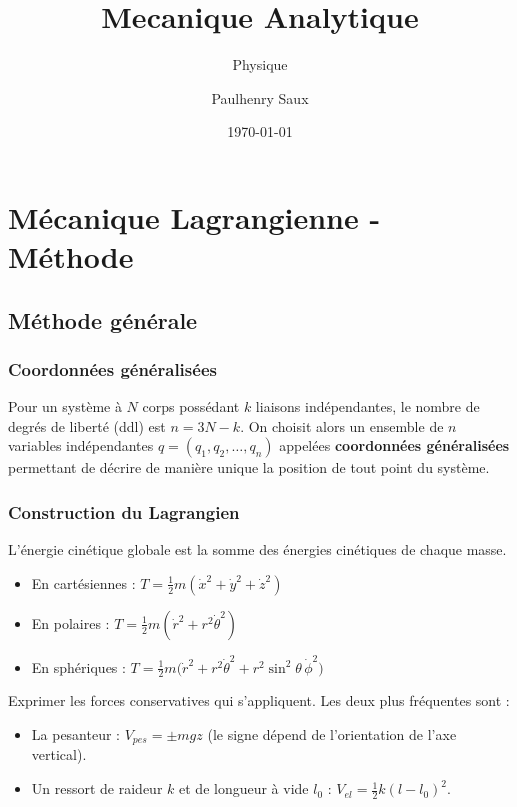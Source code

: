 \documentclass[french]{yLectureNote}
\title{Mecanique Analytique}
\subtitle{Physique}
\author{Paulhenry Saux}
\date{\today}
\begin{document}
\chapter{Mécanique Lagrangienne - Méthode}
\section{Méthode générale}
\subsection{Coordonnées généralisées}
\begin{definition}
Pour un système à $N$ corps possédant $k$ liaisons indépendantes, le nombre de degrés de liberté (ddl) est $n = 3N - k$. On choisit alors un ensemble de $n$ variables indépendantes $q = (q_1, q_2, \dots, q_n)$ appelées \textbf{coordonnées généralisées} permettant de décrire de manière unique la position de tout point du système.
\end{definition}


\subsection{Construction du Lagrangien}
\begin{proposition}
L'énergie cinétique globale est la somme des énergies cinétiques de chaque masse. 
\begin{itemize}
    \item En cartésiennes : $T = \frac{1}{2}m(\dot{x}^2 + \dot{y}^2 + \dot{z}^2)$
    \item En polaires : $T = \frac{1}{2}m(\dot{r}^2 + r^2\dot{\theta}^2)$
    \item En sphériques : $T = \frac{1}{2}m\big(\dot{r}^2 + r^2\dot{\theta}^2 + r^2\sin^2\theta\,\dot{\phi}^2\big)$
\end{itemize}
\end{proposition}

\begin{proposition}
Exprimer les forces conservatives qui s'appliquent. Les deux plus fréquentes sont :
\begin{itemize}
    \item La pesanteur : $V_{pes} = \pm mgz$ (le signe dépend de l'orientation de l'axe vertical).
    \item Un ressort de raideur $k$ et de longueur à vide $l_0$ : $V_{el} = \frac{1}{2}k(l - l_0)^2$.
\end{itemize}
\end{proposition}
\end{document}
